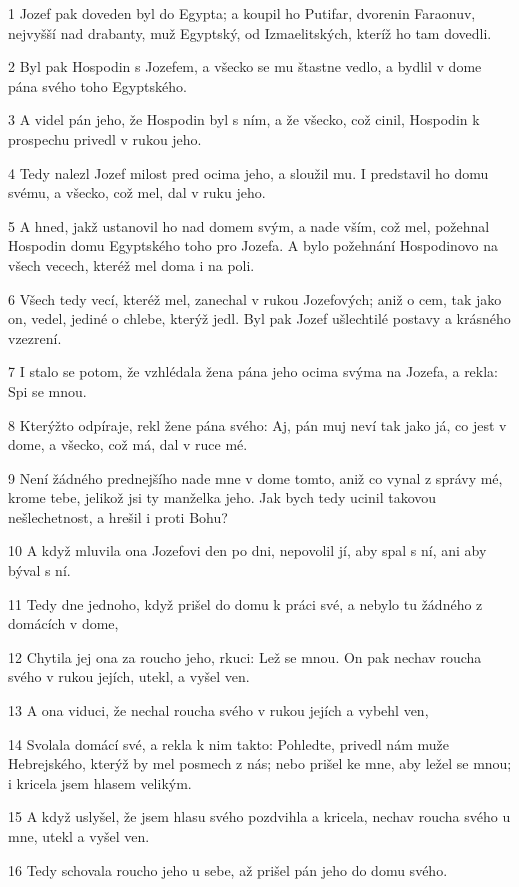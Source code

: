 \par 1 Jozef pak doveden byl do Egypta; a koupil ho Putifar, dvorenin Faraonuv, nejvyšší nad drabanty, muž Egyptský, od Izmaelitských, kteríž ho tam dovedli.
\par 2 Byl pak Hospodin s Jozefem, a všecko se mu štastne vedlo, a bydlil v dome pána svého toho Egyptského.
\par 3 A videl pán jeho, že Hospodin byl s ním, a že všecko, což cinil, Hospodin k prospechu privedl v rukou jeho.
\par 4 Tedy nalezl Jozef milost pred ocima jeho, a sloužil mu. I predstavil ho domu svému, a všecko, což mel, dal v ruku jeho.
\par 5 A hned, jakž ustanovil ho nad domem svým, a nade vším, což mel, požehnal Hospodin domu Egyptského toho pro Jozefa. A bylo požehnání Hospodinovo na všech vecech, kteréž mel doma i na poli.
\par 6 Všech tedy vecí, kteréž mel, zanechal v rukou Jozefových; aniž o cem, tak jako on, vedel, jediné o chlebe, kterýž jedl. Byl pak Jozef ušlechtilé postavy a krásného vzezrení.
\par 7 I stalo se potom, že vzhlédala žena pána jeho ocima svýma na Jozefa, a rekla: Spi se mnou.
\par 8 Kterýžto odpíraje, rekl žene pána svého: Aj, pán muj neví tak jako já, co jest v dome, a všecko, což má, dal v ruce mé.
\par 9 Není žádného prednejšího nade mne v dome tomto, aniž co vynal z správy mé, krome tebe, jelikož jsi ty manželka jeho. Jak bych tedy ucinil takovou nešlechetnost, a hrešil i proti Bohu?
\par 10 A když mluvila ona Jozefovi den po dni, nepovolil jí, aby spal s ní, ani aby býval s ní.
\par 11 Tedy dne jednoho, když prišel do domu k práci své, a nebylo tu žádného z domácích v dome,
\par 12 Chytila jej ona za roucho jeho, rkuci: Lež se mnou. On pak nechav roucha svého v rukou jejích, utekl, a vyšel ven.
\par 13 A ona viduci, že nechal roucha svého v rukou jejích a vybehl ven,
\par 14 Svolala domácí své, a rekla k nim takto: Pohledte, privedl nám muže Hebrejského, kterýž by mel posmech z nás; nebo prišel ke mne, aby ležel se mnou; i kricela jsem hlasem velikým.
\par 15 A když uslyšel, že jsem hlasu svého pozdvihla a kricela, nechav roucha svého u mne, utekl a vyšel ven.
\par 16 Tedy schovala roucho jeho u sebe, až prišel pán jeho do domu svého.
